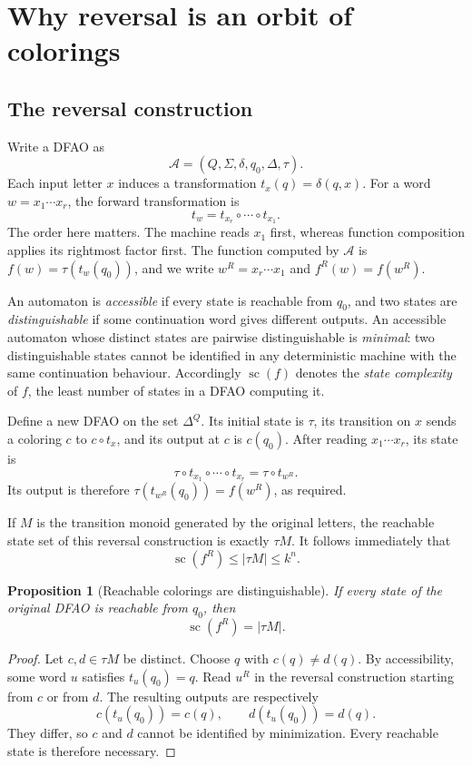 \documentclass[11pt,a4paper]{article}
\numberwithin{equation}{section}
\newtheorem{proposition}[theorem]{Proposition}
\theoremstyle{definition}
\theoremstyle{remark}
\newcommand{\D}{\Delta}
\newcommand{\statecomplex}{\operatorname{sc}}
\begin{document}
\section{Why reversal is an orbit of colorings}\label{sec:orbit}

\subsection{The reversal construction}

Write a DFAO as
\[
 \mathcal A=(Q,\Sigma,\delta,q_0,\D,\tau).
\]
Each input letter $x$ induces a transformation $t_x(q)=\delta(q,x)$.
For a word $w=x_1\cdots x_r$, the forward transformation is
\[
 t_w=t_{x_r}\circ\cdots\circ t_{x_1}.
\]
The order here matters. The machine reads $x_1$ first, whereas function
composition applies its rightmost factor first. The function computed by
$\mathcal A$ is $f(w)=\tau(t_w(q_0))$, and we write $w^R=x_r\cdots x_1$ and
$f^R(w)=f(w^R)$.

An automaton is \emph{accessible} if every state is reachable from $q_0$, and
two states are \emph{distinguishable} if some continuation word gives
different outputs. An accessible automaton whose distinct states are pairwise
distinguishable is \emph{minimal}: two distinguishable states cannot be
identified in any deterministic machine with the same continuation behaviour.
Accordingly $\statecomplex(f)$ denotes the \emph{state complexity} of $f$, the
least number of states in a DFAO computing it.

Define a new DFAO on the set $\D^Q$. Its initial state is $\tau$, its
transition on $x$ sends a coloring $c$ to $c\circ t_x$, and its output at $c$
is $c(q_0)$. After reading $x_1\cdots x_r$, its state is
\[
 \tau\circ t_{x_1}\circ\cdots\circ t_{x_r}
 =\tau\circ t_{w^R}.
\]
Its output is therefore $\tau(t_{w^R}(q_0))=f(w^R)$, as required.

If $M$ is the transition monoid generated by the original letters, the
reachable state set of this reversal construction is exactly $\tau M$.
It follows immediately that
\[
 \statecomplex(f^R)\le |\tau M|\le k^n.
\]

\begin{proposition}[Reachable colorings are distinguishable]\label{prop:orbit}
If every state of the original DFAO is reachable from $q_0$, then
\[
 \statecomplex(f^R)=|\tau M|.
\]
\end{proposition}
\begin{proof}
Let $c,d\in\tau M$ be distinct. Choose $q$ with $c(q)\ne d(q)$. By
accessibility, some word $u$ satisfies $t_u(q_0)=q$. Read $u^R$ in the
reversal construction starting from $c$ or from $d$. The resulting outputs
are respectively
\[
 c(t_u(q_0))=c(q),\qquad d(t_u(q_0))=d(q).
\]
They differ, so $c$ and $d$ cannot be identified by minimization. Every
reachable state is therefore necessary.
\end{proof}
\end{document}
